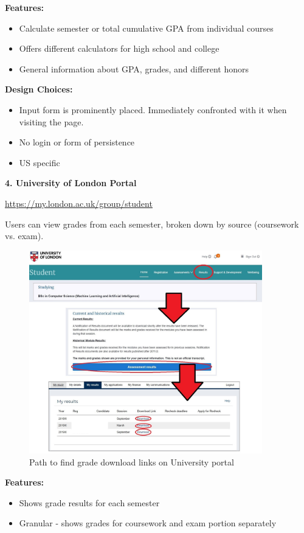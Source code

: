\documentclass{article}
\begin{document}
\noindent \textbf{Features:}
\begin{itemize}
\item Calculate semester or total cumulative GPA from individual courses
\item Offers different calculators for high school and college
\item General information about GPA, grades, and different honors
\end{itemize}
\medskip

\noindent \textbf{Design Choices:}
\begin{itemize}
\item Input form is prominently placed. Immediately confronted with it when visiting the page.
\item No login or form of persistence
\item US specific
\end{itemize}

\noindent \textbf{4. University of London Portal}

\noindent \url{https://my.london.ac.uk/group/student}
\bigskip

\noindent Users can view grades from each semester, broken down by source (coursework vs. exam).
\bigskip

\begin{figure}[h]
\noindent \includegraphics[height=250pt]{uol-buried}
\centering
\caption{Path to find grade download links on University portal}
\label{fig: uol-grades}
\end{figure}

\noindent \textbf{Features:}
\begin{itemize}
\item Shows grade results for each semester
\item Granular - shows grades for coursework and exam portion separately
\end{itemize}
\medskip
\end{document}
